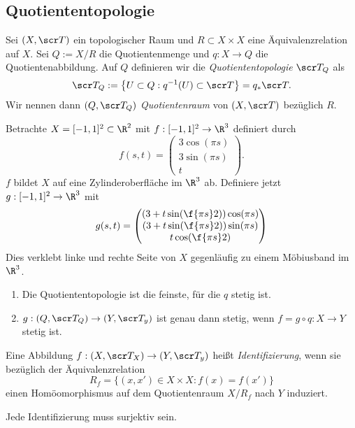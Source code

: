\subsection{Quotiententopologie}

\begin{df}
	Sei $(X, \scr T)$ ein topologischer Raum und $R \subset X \times X$ eine Äquivalenzrelation auf $X$.
	Sei $Q := X / R$ die Quotientenmenge und $q: X \to Q$ die Quotientenabbildung.
	Auf $Q$ definieren wir die \emph{Quotiententopologie} $\scr T_Q$ als
	\[
		\scr T_Q
		:= \big\{ U \subset Q : q^{-1}(U) \subset \scr T \big\}
		= q_* \scr T.
	\]
	Wir nennen dann $(Q, \scr T_Q)$ \emph{Quotientenraum} von $(X, \scr T)$ bezüglich $R$.
\end{df}

\begin{ex}
	Betrachte $X = [-1,1]^2 \subset \R^2$ mit $f: [-1,1]^2 \to \R^3$ definiert durch
	\[
		f(s, t) = \begin{pmatrix}
			3 \cos(\pi s) \\
			3 \sin(\pi s) \\
			t
		\end{pmatrix}.
	\]
	$f$ bildet $X$ auf eine Zylinderoberfläche im $\R^3$ ab.
	Definiere jetzt $g: [-1,1]^2 \to \R^3$ mit
	\[
		g(s, t) = \begin{pmatrix}
			(3 + t \sin(\f{\pi s}2)) \cos (\pi s) \\
			(3 + t \sin(\f{\pi s}2)) \sin (\pi s) \\
			t \cos(\f {\pi s}2)
		\end{pmatrix}
	\]
	Dies verklebt linke und rechte Seite von $X$ gegenläufig zu einem Möbiusband im $\R^3$.
\end{ex}

\begin{st}
	\begin{enumerate}[(1)]
		\item
			Die Quotiententopologie ist die feinste, für die $q$ stetig ist.
		\item
			$g: (Q, \scr T_Q) \to (Y, \scr T_y)$ ist genau dann stetig, wenn $f = g \circ q: X \to Y$ stetig ist.
	\end{enumerate}
\end{st}

\begin{df}
	Eine Abbildung $f: (X, \scr T_X) \to (Y, \scr T_y)$ heißt \emph{Identifizierung}, wenn sie bezüglich der Äquivalenzrelation
	\[
		R_f = \big\{ (x,x') \in X \times X : f(x) = f(x') \big\}
	\]
	einen Homöomorphismus auf dem Quotientenraum $X / R_f$ nach $Y$ induziert.
	\begin{note}
		Jede Identifizierung muss surjektiv sein.
	\end{note}
\end{df}

